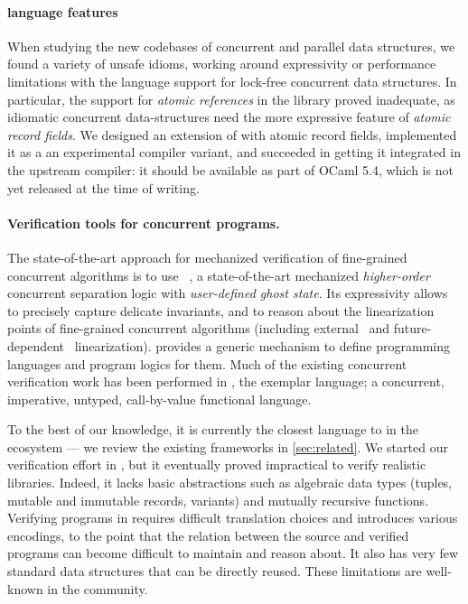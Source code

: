 \paragraph{\OCaml language features} When studying the new codebases
of concurrent and parallel data structures, we found a variety of
unsafe idioms, working around expressivity or performance limitations
with the \OCaml language support for lock-free concurrent data
structures. In particular, the support for \emph{atomic references} in
the \OCaml library proved inadequate, as idiomatic concurrent
data-structures need the more expressive feature of \emph{atomic
  record fields}. We designed an extension of \OCaml with atomic
record fields, implemented it as a an experimental compiler variant,
and succeeded in getting it integrated in the upstream \OCaml
compiler: it should be available as part of OCaml 5.4, which is not
yet released at the time of writing.

\paragraph{Verification tools for concurrent programs.} The state-of-the-art approach for mechanized verification of fine-grained concurrent algorithms is to use \Iris~\citep*{DBLP:journals/jfp/JungKJBBD18}, a state-of-the-art mechanized \emph{higher-order} concurrent separation logic with \emph{user-defined ghost state}. Its expressivity allows to precisely capture delicate invariants, and to reason about the linearization points of fine-grained concurrent algorithms (including external~\citep*{DBLP:conf/cpp/VindumFB22} and future-dependent~\citep*{DBLP:journals/pacmpl/JungLPRTDJ20,DBLP:conf/cpp/VindumB21,DBLP:conf/osdi/Chang0STKZ23} linearization). \Iris provides a generic mechanism to define programming languages and program logics for them. Much of the existing \Iris concurrent verification work has been performed in \HeapLang, the exemplar \Iris language; a concurrent, imperative, untyped, call-by-value functional language.

To the best of our knowledge, it is currently the closest language to \OCamlFive in the \Iris ecosystem --- we review the existing frameworks in \cref{sec:related}. We started our verification effort in \HeapLang, but it eventually proved impractical to verify realistic \OCaml libraries.
Indeed, it lacks basic abstractions such as algebraic data types (tuples, mutable and immutable records, variants) and mutually recursive functions.
Verifying \OCaml programs in \HeapLang requires difficult translation choices and introduces various encodings, to the point that the relation between the source and verified programs can become difficult to maintain and reason about.
It also has very few standard data structures that can be directly reused.
These limitations are well-known in the \Iris community.


